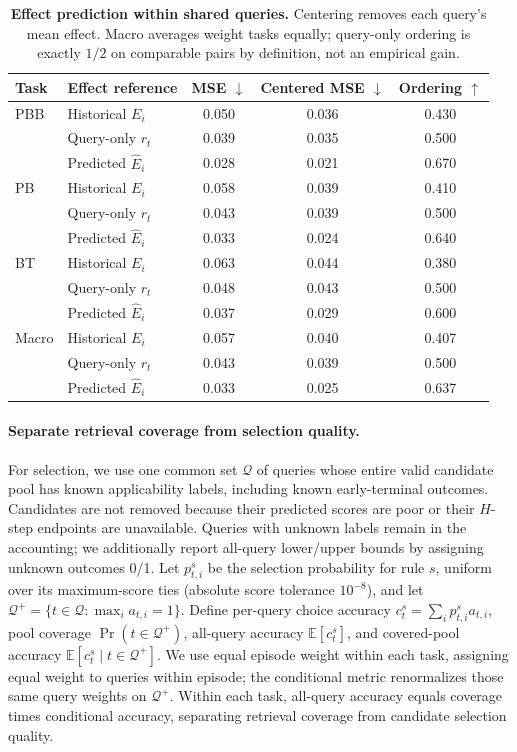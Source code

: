 \begin{table}[H]
\centering\small
\caption{\textbf{Effect prediction within shared queries.}
Centering removes each query's mean effect. Macro averages weight tasks equally; query-only ordering is exactly $1/2$ on comparable pairs by definition, not an empirical gain.}
\label{tab:rebuttal_effects}
\begin{tabular}{@{}llccc@{}}
\toprule
Task & Effect reference & MSE $\downarrow$ & Centered MSE $\downarrow$ & Ordering $\uparrow$ \\
\midrule
PBB & Historical $E_i$ & 0.050 & 0.036 & 0.430 \\
 & Query-only $r_t$ & 0.039 & 0.035 & 0.500 \\
 & Predicted $\widehat E_i$ & 0.028 & 0.021 & 0.670 \\
PB & Historical $E_i$ & 0.058 & 0.039 & 0.410 \\
 & Query-only $r_t$ & 0.043 & 0.039 & 0.500 \\
 & Predicted $\widehat E_i$ & 0.033 & 0.024 & 0.640 \\
BT & Historical $E_i$ & 0.063 & 0.044 & 0.380 \\
 & Query-only $r_t$ & 0.048 & 0.043 & 0.500 \\
 & Predicted $\widehat E_i$ & 0.037 & 0.029 & 0.600 \\
\midrule
Macro & Historical $E_i$ & 0.057 & 0.040 & 0.407 \\
 & Query-only $r_t$ & 0.043 & 0.039 & 0.500 \\
 & Predicted $\widehat E_i$ & 0.033 & 0.025 & 0.637 \\
\bottomrule
\end{tabular}
\end{table}

\paragraph{Separate retrieval coverage from selection quality.}
For selection, we use one common set $\mathcal Q$ of queries whose entire valid candidate pool has known applicability labels, including known early-terminal outcomes.
Candidates are not removed because their predicted scores are poor or their $H$-step endpoints are unavailable.
Queries with unknown labels remain in the accounting; we additionally report all-query lower/upper bounds by assigning unknown outcomes 0/1.
Let $p^s_{t,i}$ be the selection probability for rule $s$, uniform over its maximum-score ties (absolute score tolerance $10^{-8}$), and let $\mathcal Q^+=\{t\in\mathcal Q:\max_i a_{t,i}=1\}$.
Define per-query choice accuracy $c_t^s=\sum_i p^s_{t,i}a_{t,i}$, pool coverage $\Pr(t\in\mathcal Q^+)$, all-query accuracy $\mathbb E[c_t^s]$, and covered-pool accuracy $\mathbb E[c_t^s\mid t\in\mathcal Q^+]$.
We use equal episode weight within each task, assigning equal weight to queries within episode; the conditional metric renormalizes those same query weights on $\mathcal Q^+$.
Within each task, all-query accuracy equals coverage times conditional accuracy, separating retrieval coverage from candidate selection quality.

